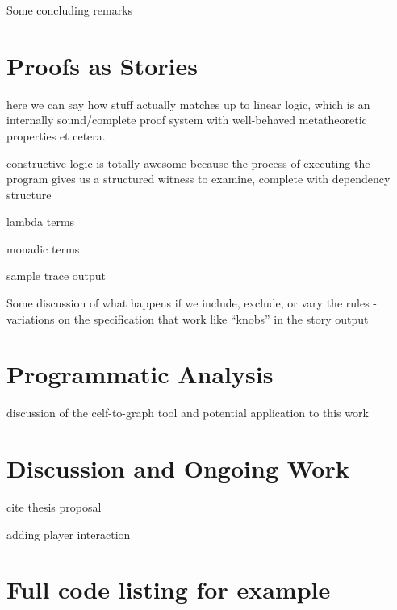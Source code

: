 \documentclass[letterpaper]{article}
\begin{document}
Some concluding remarks


\section{Proofs as Stories}

% 

here we can say how stuff actually matches up to linear logic, which is an
internally sound/complete proof system with well-behaved metatheoretic
properties et cetera.

constructive logic is totally awesome because the process of executing the
program gives us a structured witness to examine, complete with dependency
structure

lambda terms

monadic terms

sample trace output

Some discussion of what happens if we include, exclude, or vary the rules -
variations on the specification that work like ``knobs'' in the story
output

\section{Programmatic Analysis}

% 
discussion of the celf-to-graph tool and potential application to this work

\section{Discussion and Ongoing Work}

cite thesis proposal

adding player interaction

% 


% 

\appendix

\section{Full code listing for example}
\end{document}
